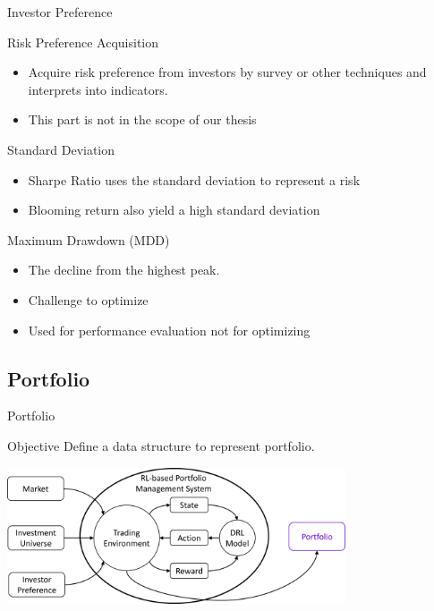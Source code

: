\begin{frame}{Investor Preference}
\begin{block}{Risk Preference Acquisition}
\begin{itemize}
    \item Acquire risk preference from investors by survey or other techniques and interprets into indicators.
    \item \alert{This part is not in the scope of our thesis}
\end{itemize}

\end{block}
\begin{block}{Standard Deviation}
\begin{itemize}
    \item Sharpe Ratio uses the standard deviation to represent a risk
    \item \alert{Blooming return also yield a high standard deviation}
\end{itemize}
\end{block}
\begin{block}{Maximum Drawdown (MDD)}
\begin{itemize}
    \item The decline from the highest peak.
    \item \alert{Challenge to optimize}
    \item Used for performance evaluation not for optimizing
\end{itemize}
\end{block}
\end{frame}



\subsection{Portfolio}


\begin{frame}{Portfolio}
    \begin{block}{Objective}
        Define a data structure to represent portfolio.
    \end{block}
\centering
\includegraphics[width=10cm]{images/portfolio.png}

\end{frame}



